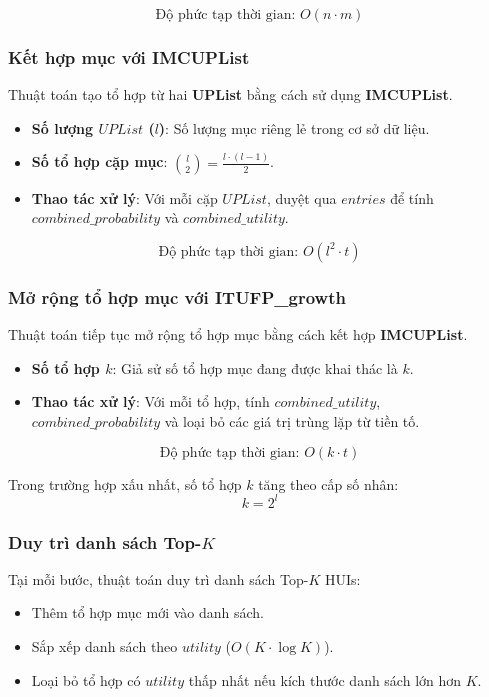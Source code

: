 \documentclass[conference]{IEEEtran}
\begin{document}
\[
\text{Độ phức tạp thời gian: } O(n \cdot m)
\]

\subsubsection{Kết hợp mục với \textbf{IMCUPList}}
Thuật toán tạo tổ hợp từ hai \textbf{UPList} bằng cách sử dụng \textbf{IMCUPList}.
\begin{itemize}
    \item \textbf{Số lượng \(UPList\) (\(l\))}: Số lượng mục riêng lẻ trong cơ sở dữ liệu.
    \item \textbf{Số tổ hợp cặp mục}: \(\binom{l}{2} = \frac{l \cdot (l-1)}{2}\).
    \item \textbf{Thao tác xử lý}: Với mỗi cặp \(UPList\), duyệt qua \(entries\) để tính \(combined\_probability\) và \(combined\_utility\).
\end{itemize}

\[
\text{Độ phức tạp thời gian: } O(l^2 \cdot t)
\]

\subsubsection{Mở rộng tổ hợp mục với \textbf{ITUFP\_growth}}
Thuật toán tiếp tục mở rộng tổ hợp mục bằng cách kết hợp \textbf{IMCUPList}.
\begin{itemize}
    \item \textbf{Số tổ hợp \(k\)}: Giả sử số tổ hợp mục đang được khai thác là \(k\).
    \item \textbf{Thao tác xử lý}: Với mỗi tổ hợp, tính \(combined\_utility\), \(combined\_probability\) và loại bỏ các giá trị trùng lặp từ tiền tố.
\end{itemize}

\[
\text{Độ phức tạp thời gian: } O(k \cdot t)
\]

Trong trường hợp xấu nhất, số tổ hợp \(k\) tăng theo cấp số nhân:
\[
k = 2^l
\]

\subsubsection{Duy trì danh sách Top-\(K\)}
Tại mỗi bước, thuật toán duy trì danh sách Top-\(K\) HUIs:
\begin{itemize}
    \item Thêm tổ hợp mục mới vào danh sách.
    \item Sắp xếp danh sách theo \(utility\) (\(O(K \cdot \log K)\)).
    \item Loại bỏ tổ hợp có \(utility\) thấp nhất nếu kích thước danh sách lớn hơn \(K\).
\end{itemize}
\end{document}
